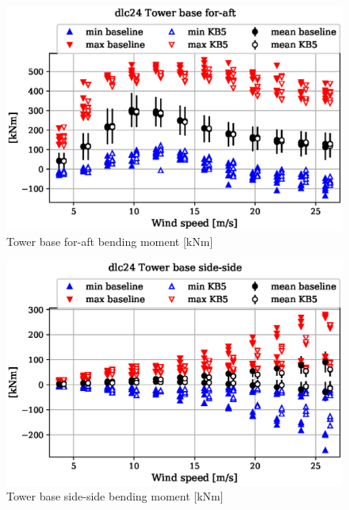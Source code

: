 \begin{figure}[!ht]
\begin{center}
	\includegraphics[width=.85\linewidth]{figures/baseline-vs-KB6/dlc24/tower-tower-node-001-momentvec-x_AA0008_AA0008.eps}
\end{center}
\caption{Tower base for-aft bending moment [kNm]}
\label{fig:baseline-vs-KB6:dlc24:tower-base-fa}
\end{figure}

\begin{figure}[!ht]
\begin{center}
	\includegraphics[width=.85\linewidth]{figures/baseline-vs-KB6/dlc24/tower-tower-node-001-momentvec-y_AA0008_AA0008.eps}
\end{center}
\caption{Tower base side-side bending moment [kNm]}
\label{fig:baseline-vs-KB6:dlc24:tower-base-ss}
\end{figure}

